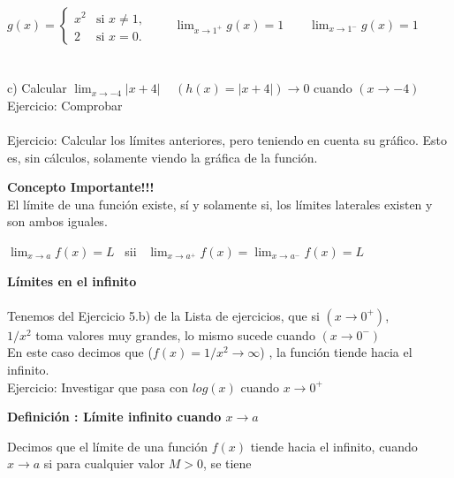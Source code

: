 \documentclass[11pt, a4paper]{article}
\begin{document}
{$ 
    g(x) = \begin{cases}
              x^2 & \text{si } x \neq 1,\\
               2 & \text{si } x = 0.
          \end{cases}
  $ ~ ~ $ \displaystyle \lim_{x \to 1^+} g(x) = 1 $ ~ ~ $ \displaystyle \lim_{x \to 1^-} g(x) = 1 $ \\ \\ \\
c) Calcular $ \displaystyle \lim_{x \to -4} |x+4| $ ~ $( h(x) = |x+4| ) \to 0 $ cuando $( x \to -4)$ \\ {\color{magenta} Ejercicio: Comprobar} \\ \\

{\color{magenta} Ejercicio: Calcular los l\'imites anteriores, pero teniendo en cuenta su gr\'afico. Esto es, sin c\'alculos, solamente viendo la gr\'afica de la funci\'on. } \\
\begin{center}
    \textbf{Concepto Importante!!!} \\ 
    El l\'imite de una funci\'on existe, s\'i y solamente si, los l\'imites laterales existen y son ambos iguales. \\ \hfill
    
    {\color{blue}$ \displaystyle \lim_{x \to a} f(x) = L  $ ~sii~ $ \displaystyle \lim_{x \to a^+} f(x) = \displaystyle \lim_{x \to a^-} f(x) = L
    $} 
\end{center}
\textbf{L\'imites en el infinito} \\ \\
Tenemos del Ejercicio 5.b) de la Lista de ejercicios, que si $(x \to 0^+)$,\\ $1/x^2$ toma valores muy grandes, lo mismo sucede cuando $(x \to 0^-)$ \\
En este caso decimos que {\color{blue} ($ f(x) = 1/x^2 \to \infty $) }, la funci\'on tiende hacia el infinito. \\

{\color{magenta} Ejercicio: Investigar que pasa con $log(x)$ cuando $x\to 0^+$} 

\begin{center}
    \textbf{Definici\'on : L\'imite infinito cuando $x\to a$} \\ \hfill

    Decimos que el l\'imite de una funci\'on $f(x)$ tiende hacia el infinito, cuando $ x\to a $ si para cualquier valor $M>0$, se tiene \\ \hfill


\end{center}}
\end{document}
